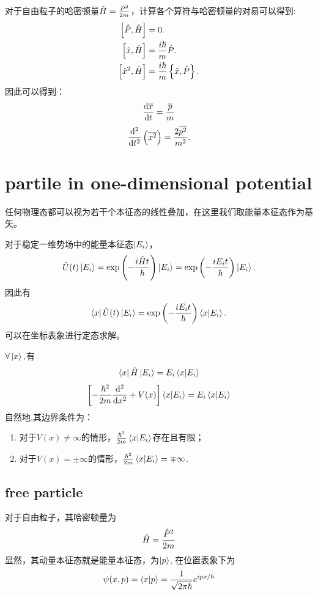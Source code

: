 对于自由粒子的哈密顿量$\hat{H}=\frac{\hat{P}^2}{2m}$，计算各个算符与哈密顿量的对易可以得到:
\begin{align}
    \left[\hat{P},\hat{H}\right]&=0.\\
    \left[\hat{x},\hat{H}\right]&=\frac{i\hbar}{m}\hat{P}.\\
    \left[\hat{x}^2,\hat{H}\right]&=\frac{i\hbar}{m}\left\lbrace\hat{x},\hat{P}\right\rbrace.
\end{align}
因此可以得到：
\begin{equation}
    \frac{\mathrm{d} \overline{x}}{\mathrm{d} t}=\frac{\overline{p}}{m}
\end{equation}
\begin{equation}
    \frac{\mathrm{d}^2 }{\mathrm{d} t^2}\left(\overline{x^2}\right)=\frac{2\overline{p^2}}{m^2}.
\end{equation}
\section{partile in one-dimensional potential}
任何物理态都可以视为若干个本征态的线性叠加，在这里我们取能量本征态作为基矢。

对于稳定一维势场中的能量本征态$\left|E_i\right>$，
\begin{equation}
    \hat{U}(t)\left|E_i\right>=\exp\left(-\frac{i\hat{H}t}{\hbar}\right)\left|E_i\right>=\exp\left(-\frac{iE_it}{\hbar}\right)\left|E_i\right>.
\end{equation}
因此有
\begin{equation}
    \left<x\right|\hat{U}(t)\left|E_i\right>=\exp\left(-\frac{iE_it}{\hbar}\right)\left<x\middle|E_i\right>.
\end{equation}
可以在坐标表象进行定态求解。

$\forall \left|x\right>, $有
\begin{equation}
    \left<x\right|\hat{H}\left|E_i\right>=E_i\left<x\middle|E_i\right>
\end{equation}
\begin{equation}
    \left[-\frac{\hbar^2}{2m}\frac{\mathrm{d}^2 }{\mathrm{d} x^2}+V(x)\right]\left<x\middle|E_i\right>=E_i\left<x\middle|E_i\right>
\end{equation}
自然地,其边界条件为：
\begin{enumerate}
    \item 对于$V(x)\neq \infty$的情形，$\frac{\hbar^2}{2m}\left<x\middle|E_i\right>$存在且有限；
    \item 对于$V(x)=\pm\infty$的情形，$\frac{\hbar^2}{2m}\left<x\middle|E_i\right>=\mp\infty$.
\end{enumerate}
\subsection{free particle}
对于自由粒子，其哈密顿量为
\begin{equation}
    \hat{H}=\frac{\hat{P}^2}{2m}
\end{equation}
显然，其动量本征态就是能量本征态，为$\left|p\right>$, 在位置表象下为
\begin{equation}
    \psi(x,p)=\left<x\middle|p\right>=\frac{1}{\sqrt{2\pi\hbar}} e^{ipx/\hbar}
\end{equation}
